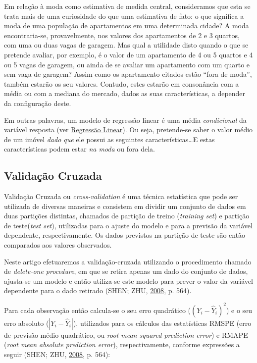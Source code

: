 \documentclass[a4paper, 12pt]{article}
\begin{document}
Em relação à moda como estimativa de medida central, consideramos que
esta se trata mais de uma curiosidade do que uma estimativa de fato: o
que significa a moda de uma população de apartamentos em uma determinada
cidade? A moda encontraria-se, provavelmente, nos valores dos
apartamentos de 2 e 3 quartos, com uma ou duas vagas de garagem. Mas
qual a utilidade disto quando o que se pretende avaliar, por exemplo, é
o valor de um apartamento de 4 ou 5 quartos e 4 ou 5 vagas de garagem,
ou ainda de se avaliar um apartamento com um quarto e sem vaga de
garagem? Assim como os apartamento citados estão ``fora de moda'',
também estarão os seu valores. Contudo, estes estarão em consonância com
a média ou com a mediana do mercado, dados as suas características, a
depender da configuração deste.

Em outras palavras, um modelo de regressão linear é uma média
\emph{condicional} da variável resposta (ver
\protect\hyperlink{regressao-linear}{Regressão Linear}). Ou seja,
pretende-se saber o valor médio de um imóvel \emph{dado que} ele possui
as seguintes características\ldots{}E estas características podem estar
\emph{na moda} ou fora dela.

\subsection{Validação Cruzada}\label{validacao-cruzada}

Validação Cruzada ou \emph{cross-validation} é uma técnica estatística
que pode ser utilizada de diversas maneiras e consistem em dividir um
conjunto de dados em duas partições distintas, chamados de partição de
treino (\emph{training set}) e partição de teste(\emph{test set}),
utilizadas para o ajuste do modelo e para a previsão da variável
dependente, respectivamente. Os dados previstos na partição de teste são
então comparados aos valores observados.

Neste artigo efetuaremos a validação-cruzada utilizando o procedimento
chamado de \emph{delete-one procedure}, em que se retira apenas um dado
do conjunto de dados, ajusta-se um modelo e então utiliza-se este modelo
para prever o valor da variável dependente para o dado retirado (SHEN;
ZHU, \protect\hyperlink{ref-shen}{2008}, p. 564).

Para cada observação então calcula-se o seu erro quadrático
(\((Y_i - \hat{Y}_i)^2\)) e o seu erro absoluto (\(|Y_i - \hat{Y}_i|\)),
utilizados para os cálculos das estatísticas RMSPE (erro de previsão
médio quadrático, ou \emph{root mean squared prediction error}) e RMAPE
(\emph{root mean absolute prediction error}), respectivamente, conforme
expressões a seguir (SHEN; ZHU, \protect\hyperlink{ref-shen}{2008}, p.
564):
\end{document}
